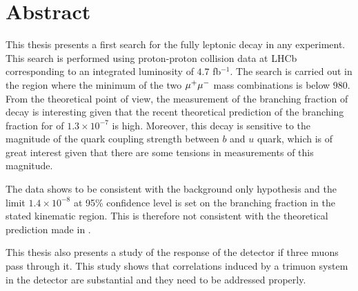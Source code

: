 \chapter*{Abstract}
\noindent
This thesis presents a first search for the fully leptonic decay \Bmumumu in any experiment. This search is performed using
proton-proton collision data at LHCb corresponding to an integrated luminosity of $4.7$ fb$^{-1}$. The search is carried out in the
region where the minimum of the two ${\mu^+\mu^-}$ mass combinations is below $980$\mevcc. From the theoretical point of view, the measurement of the branching fraction of decay is interesting given that the recent theoretical prediction \cite{Danilina:2018uzr} of the branching fraction for \Bmumumu of $1.3 \times 10^{-7}$ is high. Moreover, this decay is sensitive to the magnitude of the quark coupling strength between $b$ and $u$ quark, which is of great interest given that there are some tensions in measurements of this magnitude.

The data shows to be consistent with the background only hypothesis and the limit $1.4 \times 10^{-8}$ at 95\% confidence level is set on the branching fraction in the stated kinematic region. This is therefore not consistent with the theoretical prediction made in \cite{Danilina:2018uzr}.

This thesis also presents a study of the response of the detector if three muons pass through it. This study shows that correlations induced by a trimuon system in the detector are substantial and they need to be addressed properly.



